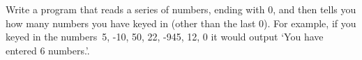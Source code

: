Write a program that reads a series of numbers, ending with 0, and then tells you how
many numbers you have keyed in (other than the last 0).  For example, if you keyed in the
numbers~5, -10, 50, 22, -945, 12, 0 it would output `You have entered 6
numbers.'.









